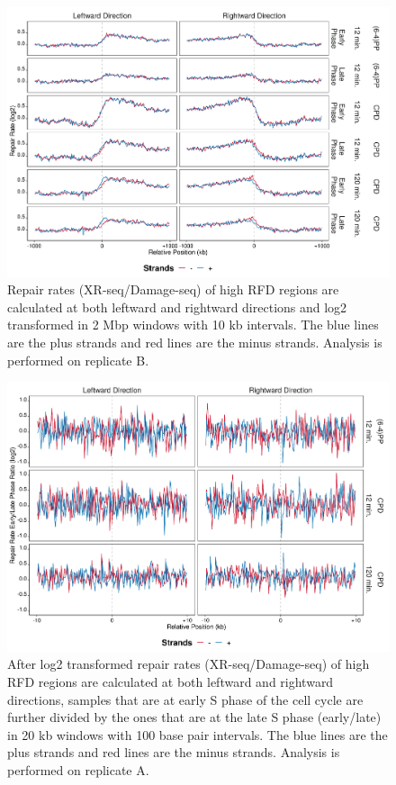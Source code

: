 \begin{figure}[H]
\begin{center}
\includegraphics[width=\textwidth]{Chapters/7_appendix/figures/supfig67}
\caption[Repair rate of high RFDs in 2 Mbp (replicate B).]{Repair rates (XR-seq/Damage-seq) of high RFD regions are calculated at both leftward and rightward directions and log2 transformed in 2 Mbp windows with 10 kb intervals. The blue lines are the plus strands and red lines are the minus strands. Analysis is performed on replicate B.}
\label{supfig:rr2000rfdB}
\end{center}
\end{figure}

\begin{figure}[H]
\begin{center}
\includegraphics[width=\textwidth]{Chapters/7_appendix/figures/supfig68}
\caption[Repair rate early/late ratio of high RFDs in 20 kb (replicate A).]{After log2 transformed repair rates (XR-seq/Damage-seq) of high RFD regions are calculated at both leftward and rightward directions, samples that are at early S phase of the cell cycle are further divided by the ones that are at the late S phase (early/late) in 20 kb windows with 100 base pair intervals. The blue lines are the plus strands and red lines are the minus strands. Analysis is performed on replicate A.}
\label{supfig:rrel20rfdA}
\end{center}
\end{figure}

